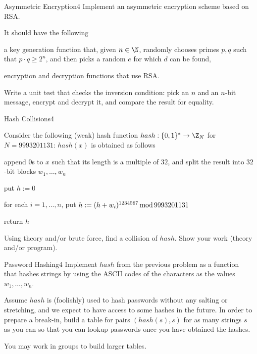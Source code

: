 \documentclass[a4paper]{article}
\begin{document}
\header

\begin{problem}{Asymmetric Encryption}{4}
Implement an asymmetric encryption scheme based on RSA.

It should have the following
\begin{compactitem}
 \item a key generation function that, given $n\in \N$, randomly chooses primes $p,q$ such that $p\cdot q\geq 2^n$, and then picks a random $e$ for which $d$ can be found,
 \item encryption and decryption functions that use RSA.
\end{compactitem}

Write a unit test that checks the inversion condition: pick an $n$ and an $n$-bit message, encrypt and decrypt it, and compare the result for equality.
\end{problem}

\begin{problem}{Hash Collisions}{4}

Consider the following (weak) hash function $hash:\{0,1\}^*\to \Z_N$ for $N=9993201131$: $hash(x)$ is obtained as follows
\begin{compactenum}
 \item append $0$s to $x$ such that its length is a multiple of $32$, and split the result into $32$-bit blocks $w_1,\ldots, w_n$
 \item put $h:=0$
 \item for each $i=1,\ldots,n$, put $h:=(h+w_i)^{1234567}\mathop{\mathrm{mod}} 9993201131$
 \item return $h$
\end{compactenum}

Using theory and/or brute force, find a collision of $hash$.
Show your work (theory and/or program).
\end{problem}

\begin{problem}{Password Hashing}{4}
Implement $hash$ from the previous problem as a function that hashes strings by using the ASCII codes of the characters as the values $w_1,\ldots,w_n$.

Assume $hash$ is (foolishly) used to hash passwords without any salting or stretching, and we expect to have access to some hashes in the future.
In order to prepare a break-in, build a table for pairs $(hash(s),s)$ for as many strings $s$ as you can so that you can lookup passwords once you have obtained the hashes.

You may work in groups to build larger tables.
\end{problem}
\end{document}
